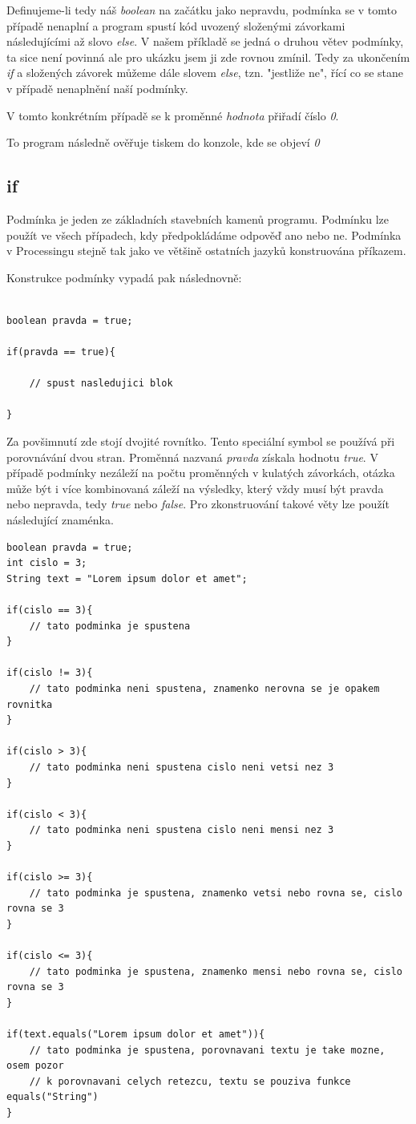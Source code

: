 \documentclass[10pt]{book}
\newcommand{\pododdil}[1]{\subsection{#1}\index{#1}\label{#1}}
\begin{document}
Definujeme-li tedy náš {\em boolean} na začátku jako nepravdu, podmínka se v tomto případě nenaplní a program spustí kód uvozený složenými závorkami následujícími až slovo {\em else}.
V našem příkladě se jedná o druhou větev podmínky, ta sice není povinná ale pro ukázku jsem ji zde rovnou zmínil. Tedy za ukončením {\em if} a složených závorek můžeme dále slovem {\em else}, tzn. "jestliže ne", řící co se stane v případě nenaplnění naší podmínky.

V tomto konkrétním případě se k proměnné {\em hodnota} přiřadí číslo {\em 0}.

To program následně ověřuje tiskem do konzole, kde se objeví {\em 0}


\pododdil{if}

Podmínka je jeden ze základních stavebních kamenů programu. Podmínku lze použít ve všech případech, kdy předpokládáme odpověď ano nebo ne. Podmínka v Processingu stejně tak jako ve většině ostatních jazyků konstruována příkazem.

Konstrukce podmínky vypadá pak následnovně:


\begin{lstlisting}

boolean pravda = true;

if(pravda == true){

    // spust nasledujici blok

}

\end{lstlisting}

Za povšimnutí zde stojí dvojité rovnítko. Tento speciální symbol se používá při porovnávání dvou stran. Proměnná nazvaná {\em pravda} získala hodnotu {\em true}. V případě podmínky nezáleží na počtu proměnných v kulatých závorkách, otázka může být i více kombinovaná záleží na výsledky, který vždy musí být pravda nebo nepravda, tedy {\em true} nebo {\em false}. Pro zkonstruování takové věty lze použít následující znaménka.

\begin{lstlisting}
boolean pravda = true;
int cislo = 3;
String text = "Lorem ipsum dolor et amet";

if(cislo == 3){
    // tato podminka je spustena
}

if(cislo != 3){
    // tato podminka neni spustena, znamenko nerovna se je opakem rovnitka
}

if(cislo > 3){
    // tato podminka neni spustena cislo neni vetsi nez 3
}

if(cislo < 3){
    // tato podminka neni spustena cislo neni mensi nez 3
}

if(cislo >= 3){
    // tato podminka je spustena, znamenko vetsi nebo rovna se, cislo rovna se 3
}

if(cislo <= 3){
    // tato podminka je spustena, znamenko mensi nebo rovna se, cislo rovna se 3
}

if(text.equals("Lorem ipsum dolor et amet")){
	// tato podminka je spustena, porovnavani textu je take mozne, osem pozor
	// k porovnavani celych retezcu, textu se pouziva funkce equals("String")
}

\end{lstlisting}
\end{document}
